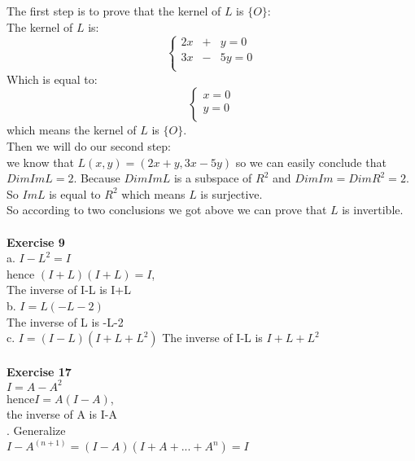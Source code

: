 \documentclass[12pt]{amsart}
\begin{document}
The first step is to prove that the kernel of $L$ is $\{O\}$:\\
The kernel of $L$ is:
$$\left\{
\begin{aligned}
2x&+& y= 0 \\
3x&-&5y= 0 \\
\end{aligned}
\right.
$$ 
Which is equal to:
$$\left\{
\begin{aligned}
x= 0 \\
y= 0 \\
\end{aligned}
\right.
$$ 
which means the kernel of $L$ is $\{O\}$.\\
Then we will do our second step:\\
we know that $L(x,y) = (2x+y,3x-5y)$ so we can easily conclude that $DimImL = 2$. Because $DimImL$ is a subspace of $R^2$ and $DimIm = DimR^2 = 2$. So $ImL$ is equal to $R^2$ which means $L$ is surjective.\\
So according to two conclusions we got above we can prove that $L$ is invertible.\\
\\
\textbf{Exercise 9}\\
a. $I - L^2 = I$\\
hence $(I+L)(I+L)=I$,\\
The inverse of I-L is I+L\\
b. $I=L(-L-2)$\\
The inverse of L is -L-2\\
c. $I=(I-L)(I+L+L^2)$
The inverse of I-L is $I+L+L^2$\\
\\
\textbf{Exercise 17}\\
$I=A-A^2$\\
hence$I=A(I-A)$,\\
the inverse of A is I-A\\.
Generalize\\
$I-A^(n+1)=(I-A)(I+A+...+A^n)=I$
\end{document}

